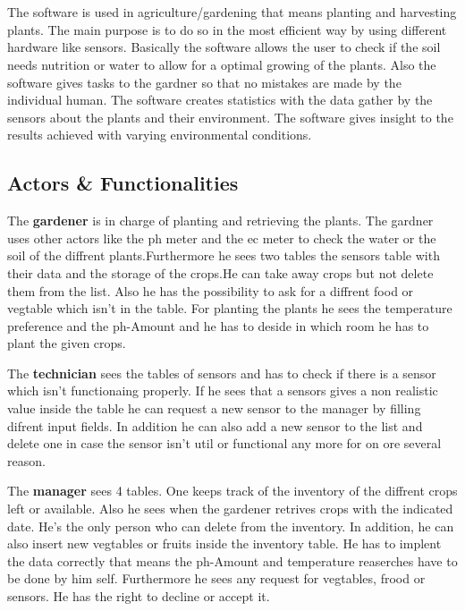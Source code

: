 \section{\mysystemname}

The software is used in agriculture/gardening that means planting and harvesting
plants. The main purpose is to do so in the most efficient way by using
different hardware like sensors. Basically the software allows the user to check
if the soil needs nutrition or water to allow for a optimal growing of the
plants. Also the software gives tasks to the gardner so that no mistakes are
made by the individual human. The software creates statistics with the data
gather by the sensors about the plants and their environment. The software gives
insight to the results achieved with varying environmental conditions.


\subsection{Actors \& Functionalities}

The \textbf{gardener} is in charge of planting and retrieving the plants. The
gardner uses other actors like the ph meter and the ec meter to check the water
or the soil of the diffrent plants.Furthermore he sees two tables the
sensors table with their data and the storage of the crops.He can take
away crops but not delete them from the list. Also he has the possibility
to ask for a diffrent food or vegtable which isn't in the table. For
planting the plants he sees the temperature preference and the ph-Amount
and he has to deside in which room he has to plant the given crops.\break

\noindent The \textbf{technician} sees the tables of sensors and has to
check if there is a sensor which isn't functionaing properly. If he sees
that a sensors gives a non realistic value inside the table he can request
a new sensor to the manager by filling difrent input fields. In addition
he can also add a new sensor to the list and delete one in case the sensor
isn't util or functional any more for on ore several reason.\break

\noindent The \textbf{manager} sees 4 tables. One keeps track of the
inventory of the diffrent crops left or available. Also he sees when the
gardener retrives crops with the indicated date. He's the only person who
can delete from the inventory. In addition, he can also insert new
vegtables or fruits inside the inventory table. He has to implent the data
correctly that means the ph-Amount and temperature reaserches have to be
done by him self. Furthermore he sees any request for vegtables, frood or
sensors. He has the right to decline or accept it.\break

